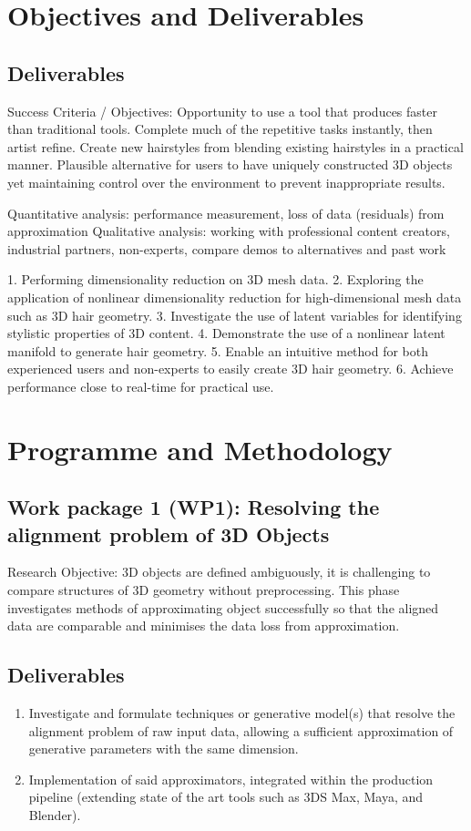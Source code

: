 \documentclass[a4paper, fontsize=15pt, onecolumn]{article} %
\numberwithin{equation}{section} %
\numberwithin{figure}{section} %
\numberwithin{table}{section} %
\begin{document}
\section{Objectives and Deliverables}
\subsection{Deliverables}
Success Criteria / Objectives: 
Opportunity to use a tool that produces faster than traditional tools.
Complete much of the repetitive tasks instantly, then artist refine.
Create new hairstyles from blending existing hairstyles in a practical manner.
Plausible alternative for users to have uniquely constructed 3D objects yet maintaining control over the environment to prevent inappropriate results.

Quantitative analysis: performance measurement, loss of data (residuals) from approximation
Qualitative analysis: working with professional content creators, industrial partners, non-experts, compare demos to alternatives and past work

1. Performing dimensionality reduction on 3D mesh data.
2. Exploring the application of nonlinear dimensionality reduction for high-dimensional mesh data
such as 3D hair geometry.
3. Investigate the use of latent variables for identifying stylistic properties of 3D content.
4. Demonstrate the use of a nonlinear latent manifold to generate hair geometry.
5. Enable an intuitive method for both experienced users and non-experts to easily create 3D hair
geometry.
6. Achieve performance close to real-time for practical use.

\section{Programme and Methodology}
\subsection{Work package 1 (WP1): Resolving the alignment problem of 3D Objects}	
Research Objective: 3D objects are defined ambiguously, it is challenging to compare structures of 3D geometry without preprocessing. This phase investigates methods of approximating object successfully so that the aligned data are comparable and minimises the data loss from approximation.

\subsection{Deliverables}
\begin{enumerate}
	\item Investigate and formulate techniques or generative model(s) that resolve the alignment problem of raw input data, allowing a sufficient approximation of generative parameters with the same dimension.
	\item Implementation of said approximators, integrated within the production pipeline (extending state of the art tools such as 3DS Max, Maya, and Blender).
\end{enumerate}
\end{document}
